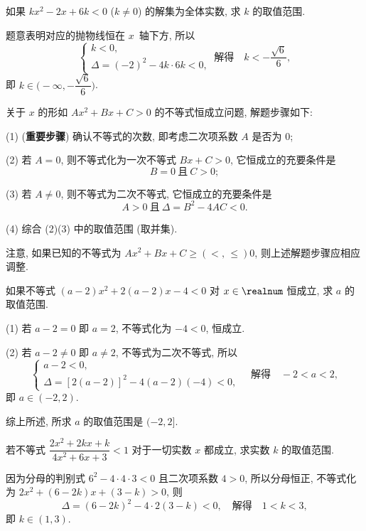 \begin{example}
  如果 $kx^2-2x+6k<0$ ($k\neq 0$) 的解集为全体实数, 求 $k$ 的取值范围.
\end{example}
\begin{solution}
  题意表明对应的抛物线恒在 $x$~轴下方, 所以
  \[\left\{\!\!\begin{array}{l}
      k<0,\\
      \Delta= (-2)^2- 4k\cdot 6k<0,
    \end{array}\right.\ \text{解得}\quad
    k<-\frac{\sqrt6}6,\]
  即 $k\in\biggl(-\infty, -\dfrac{\sqrt6}6\biggr)$.
\end{solution}

关于 $x$ 的形如 $Ax^2+Bx+C>0$ 的不等式恒成立问题, 解题步骤如下:

(1) ({\bfseries 重要步骤}) 确认不等式的次数, 即考虑二次项系数 $A$ 是否为 $0$;

(2) 若 $A=0$, 则不等式化为一次不等式 $Bx+C>0$, 它恒成立的充要条件是
\[B=0\ \text{且}\ C>0;\]

(3) 若 $A\neq0$, 则不等式为二次不等式, 它恒成立的充要条件是
\[A>0\ \text{且}\ \Delta=B^2-4AC<0.\]

(4) 综合 (2)(3) 中的取值范围 (取并集).

注意, 如果已知的不等式为 $Ax^2+Bx+C\geqslant(<,\,\leqslant) 0$, 则上述解题步骤应相应调整.

\begin{example}
  如果不等式 $(a-2)x^2+2(a-2)x-4<0$ 对 $x\in\realnum$ 恒成立, 求 $a$ 的取值范围.
\end{example}
\begin{solution}
  (1) 若 $a-2=0$ 即 $a=2$, 不等式化为 $-4<0$, 恒成立.
  
  (2) 若 $a-2\neq 0$ 即 $a\neq2$, 不等式为二次不等式, 所以
  \[\left\{\!\!\begin{array}{l}
      a-2<0,\\
      \Delta= [2(a-2)]^2- 4(a-2)(-4)<0,
    \end{array}\right.\quad\text{解得}\quad
    -2<a<2,\]
  即 $a\in(-2,2)$.
  
  综上所述, 所求 $a$ 的取值范围是 $(-2,2]$.
\end{solution}

\begin{example}\label{exa:201020-2000}
  若不等式 $\dfrac{2x^2+2kx+k}{4x^2+6x+3}<1$ 对于一切实数 $x$ 都成立, 求实数 $k$ 的取值范围.
\end{example}
\begin{solution}
  因为分母的判别式 $6^2-4\cdot4\cdot3<0$ 且二次项系数 $4>0$, 所以分母恒正, 不等式化为 $2x^2+(6-2k)x+(3-k)>0$, 则
  \[\Delta= (6-2k)^2- 4\cdot2(3-k)<0,\quad\text{解得}\quad
    1<k<3,\]
  即 $k\in(1,3)$.
\end{solution}


